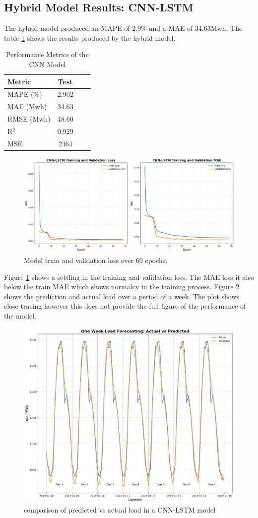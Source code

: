 \subsection{Hybrid Model Results: CNN-LSTM}
 The hybrid model produced an MAPE of 2.9\% and a MAE of 34.63Mwh. The table \ref{tab:cnn-lstm-results} shows the results produced by the hybrid model.
  \begin{table}[h]
 	\centering
 	\caption{Performance Metrics of the CNN Model}
 	\label{tab:cnn-lstm-results}
 	\begin{tabular}{lccc}
 		\hline
 		\textbf{Metric} & \textbf{Test} \\
 		\hline
 		MAPE (\%) &  2.902 \\
 		MAE (Mwh) &   34.63  \\
 		RMSE (Mwh) &  48.60  \\
 		R$^2$ &  0.929  \\
 		MSE & 2464  \\
 		\hline
 	\end{tabular}
 \end{table}
 \begin{figure}[h]
 	\centering
 	\includegraphics[width=0.9\linewidth,height=0.3\textwidth]{Chapters/images/results/CNN-LSTM-MODEL-LOSS}
 	\caption{Model train and validation loss over 69 epochs.}
 	\label{fig:cnn-lstm-model-loss}
 \end{figure}
Figure \ref{fig:cnn-lstm-model-loss} shows a settling in the training and validation loss. The MAE loss it also below the train MAE which shows normalcy in the training process. Figure \ref{fig:cnnlstmpredictionvsactual} shows the prediction and actual load over a period of a week. The plot shows close tracing however this does not provide the full figure of the performance of the model.
 \begin{figure}[h]
 	\centering
 	\includegraphics[width=0.9\linewidth,height=0.38\textwidth]{Chapters/images/results/cnn_lstm_prediction_vs_actual}
 	\caption{comparison of predicted vs actual load in a CNN-LSTM model}
 	\label{fig:cnnlstmpredictionvsactual}
 \end{figure}
 
